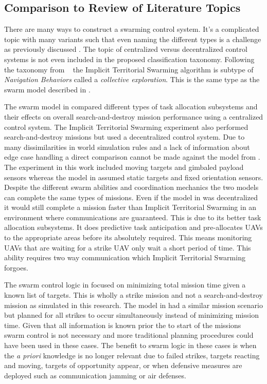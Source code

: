 \begin{multicols*}{2}
\section{Comparison to Review of Literature Topics}
There are many ways to construct a swarming control system.  It's a complicated topic with many variants such that even naming the different types is a challenge as previously discussed \parencite{iridia}. The topic of centralized versus decentralized control systems is not even included in the proposed classification taxonomy. Following the taxonomy from ~\textcite{iridia} the Implicit Territorial Swarming algorithm is subtype of \textit{Navigation Behaviors} called a \textit{collective exploration}.  This is the same type as the swarm model described in \textcite{jin}.

The swarm model in \textcite{jin} compared different types of task allocation subsystems and their effects on overall search-and-destroy mission performance using a centralized control system.  The Implicit Territorial Swarming experiment also performed search-and-destroy missions but used a decentralized control system.  Due to many dissimilarities in world simulation rules and a lack of information about edge case handling a direct comparison cannot be made against the model from \textcite{jin}.  The experiment in this work included moving targets and gimbaled payload sensors whereas the model in \textcite{jin} assumed static targets and fixed orientation sensors.  Despite the different swarm abilities and coordination mechanics the two models can complete the same types of missions.  Even if the model in \textcite{jin} was decentralized it would still complete a mission faster than Implicit Territorial Swarming in an environment where communications are guaranteed.  This is due to its better task allocation subsystems.  It does predictive task anticipation and pre-allocates UAVs to the appropriate areas before its absolutely required.  This means monitoring UAVs that are waiting for a strike UAV only wait a short period of time.  This ability requires two way communication which Implicit Territorial Swarming forgoes.

The swarm control logic in \textcite{bellingham} focused on minimizing total mission time given a known list of targets.  This is wholly a strike mission and not a search-and-destroy mission as simulated in this research.  The model in \textcite{beard} had a similar mission scenario but planned for all strikes to occur simultaneously instead of minimizing mission time.  Given that all information is known prior the to start of the missions swarm control is not necessary and more traditional planning procedures could have been used in these cases.  The benefit to swarm logic in these cases is when the \textit{a priori} knowledge is no longer relevant due to failed strikes, targets reacting and moving, targets of opportunity appear, or when defensive measures are deployed such as communication jamming or air defenses.


\end{multicols*}
